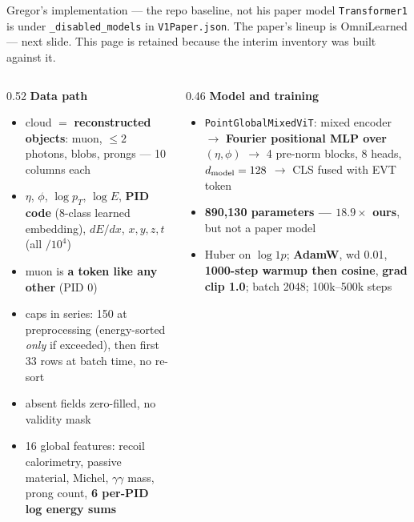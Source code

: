 \documentclass[aspectratio=169,10pt]{beamer}
\newcommand{\warn}[1]{\textcolor{warn}{#1}}
\begin{document}
\begin{frame}{Gregor's implementation --- the repo baseline, \warn{not his paper model}}
  \vspace{-0.2em}
  {\scriptsize \warn{\texttt{Transformer1} is under \texttt{\_disabled\_models} in
  \texttt{V1Paper.json}. The paper's lineup is OmniLearned --- next slide.} This page is
  retained because the interim inventory was built against it.}
  \vspace{0.2em}
  \begin{columns}[T]
    \begin{column}{0.52\textwidth}
      {\small\textbf{Data path}}
      \begin{itemize}\footnotesize
        \item cloud $=$ \textbf{reconstructed objects}: muon, $\le 2$ photons, blobs,
          prongs --- 10 columns each
        \item $\eta$, $\phi$, $\log p_T$, $\log E$, \textbf{PID code} (8-class learned
          embedding), $dE/dx$, $x,y,z,t$ (all $/10^4$)
        \item muon is \textbf{a token like any other} (PID 0)
        \item caps in series: 150 at preprocessing (energy-sorted \emph{only} if
          exceeded), then \warn{first 33 rows at batch time, no re-sort}
        \item absent fields \warn{zero-filled, no validity mask}
        \item 16 global features: recoil calorimetry, passive material, Michel, $\gamma\gamma$
          mass, prong count, \textbf{6 per-PID log energy sums}
      \end{itemize}
    \end{column}
    \begin{column}{0.46\textwidth}
      {\small\textbf{Model and training}}
      \begin{itemize}\footnotesize
        \item \texttt{PointGlobalMixedViT}: mixed encoder $\to$ \textbf{Fourier
          positional MLP over $(\eta,\phi)$} $\to$ 4 pre-norm blocks, 8 heads,
          $d_{\rm model}=128$ $\to$ CLS fused with EVT token
        \item \textbf{890{,}130 parameters --- $18.9\times$ ours}, but \warn{not a paper model}
        \item Huber on $\log 1p$; \textbf{AdamW}, wd 0.01, \textbf{1000-step warmup then
          cosine}, \textbf{grad clip 1.0}; batch 2048; 100k--500k steps

\end{itemize}
\end{column}
\end{columns}
\end{frame}
\end{document}

